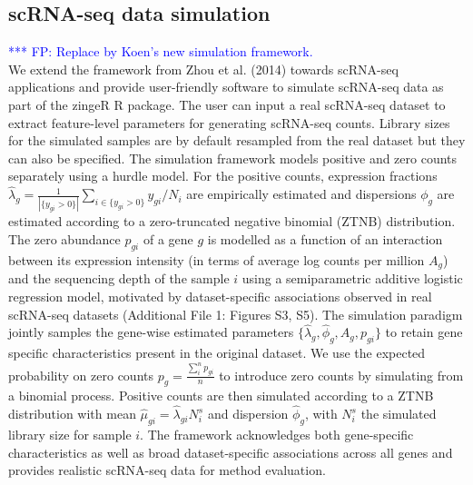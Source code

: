 \documentclass{bmcart}
\newcommand{\fanny}[1]{\textcolor{blue}{*** FP: #1}}
\begin{document}
\subsection*{scRNA-seq data simulation}

\fanny{Replace by Koen's new simulation framework.}\\
We extend the framework from Zhou et al. (2014) \cite{Zhou2014} towards scRNA-seq applications and provide user-friendly software to simulate scRNA-seq data as part of the zingeR R package.
The user can input a real scRNA-seq dataset to extract feature-level parameters for generating scRNA-seq counts.
Library sizes for the simulated samples are by default resampled from the real dataset but they can also be specified.
The simulation framework models positive and zero counts separately using a hurdle model.
For the positive counts, expression fractions $\hat \lambda_g = \frac{1}{|\{ y_{gi} > 0\}|} \sum_{i \in \{ y_{gi} > 0\}} y_{gi}/N_i$ are empirically estimated and dispersions $\phi_g$ are estimated according to a zero-truncated negative binomial (ZTNB) distribution.
The zero abundance $p_{gi}$ of a gene $g$ is modelled as a function of an interaction between its expression intensity (in terms of average log counts per million $A_g$) and the sequencing depth of the sample $i$ using a semiparametric additive logistic regression model, motivated by dataset-specific associations observed in real scRNA-seq datasets (Additional File 1: Figures S3, S5).
The simulation paradigm jointly samples the gene-wise estimated parameters $\{\hat \lambda_{g}, \hat \phi_g, A_g, p_{gi}\}$ to retain gene specific characteristics present in the original dataset.
We use the expected probability on zero counts $p_g = \frac{\sum_{i}^n p_{gi}}{n}$ to introduce zero counts by simulating from a binomial process. 
Positive counts are then simulated according to a ZTNB distribution with mean $\hat \mu_{gi} = \hat \lambda_{gi} N_i^s$ and dispersion $\hat \phi_g$, with $N_i^s$ the simulated library size for sample $i$.
The framework acknowledges both gene-specific characteristics as well as broad dataset-specific associations across all genes and  provides realistic scRNA-seq data for method evaluation.\\
\end{document}
